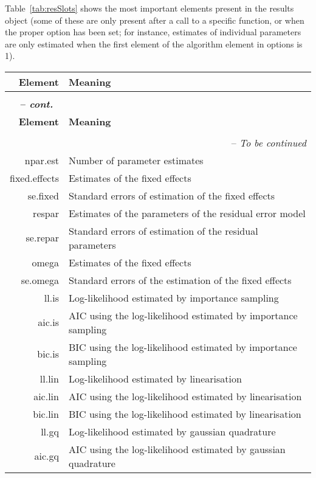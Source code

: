 Table~\ref{tab:resSlots} shows the most important elements present in the results object (some of these are only present after a call to a specific function, or when the proper option has been set; for instance, estimates of individual parameters are only estimated when the first element of the {\sf algorithm} element in {\sf options} is 1).
\begin{center}
\begin{longtable}{r p{12cm}}
\hline {\bf Element} & {\bf Meaning}\\
\hline
& \\
\endfirsthead
\multicolumn{2}{l}{{\itshape \bfseries \tablename\ \thetable{} -- cont.}} \\
\hline {\bf Element} & {\bf Meaning}\\
\hline
& \\
\endhead
\hline \multicolumn{2}{r}{{-- {\it To be continued}}} \\ 
\endfoot
\endlastfoot
{\sf npar.est} & Number of parameter estimates \\
{\sf fixed.effects} & Estimates of the fixed effects \\ 
{\sf se.fixed} & Standard errors of estimation of the fixed effects\\
{\sf respar} & Estimates of the parameters of the residual error model \\ 
{\sf se.repar} & Standard errors of estimation of the residual parameters\\
{\sf omega} & Estimates of the fixed effects \\ 
{\sf se.omega} & Standard errors of the estimation of the fixed effects\\
{\sf ll.is} & Log-likelihood estimated by importance sampling\\
{\sf aic.is} & AIC using the log-likelihood estimated by importance sampling \\
{\sf bic.is} & BIC using the log-likelihood estimated by importance sampling \\
{\sf ll.lin} & Log-likelihood estimated by linearisation\\
{\sf aic.lin} & AIC using the log-likelihood estimated by linearisation \\
{\sf bic.lin} & BIC using the log-likelihood estimated by linearisation \\
{\sf ll.gq} & Log-likelihood estimated by gaussian quadrature\\
{\sf aic.gq} & AIC using the log-likelihood estimated by gaussian quadrature \\

\end{longtable}
\end{center}
